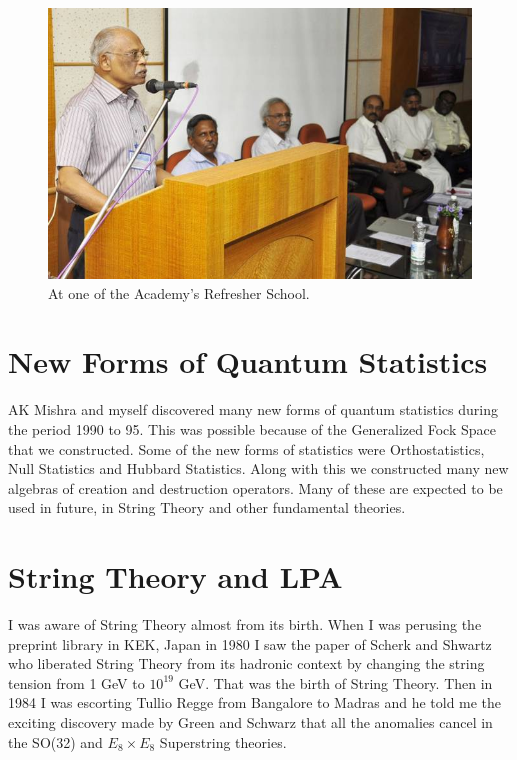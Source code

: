 \begin{figure}[h]
\centering
\includegraphics[width=\textwidth]{images/Rajaji-outreach-1.jpg}
\caption{At one of the Academy's Refresher School.}
\end{figure}
     
\section*{New Forms of Quantum Statistics}

AK Mishra and myself discovered many new forms of quantum statistics during
the period 1990 to 95. This was possible because of the Generalized Fock Space
that we constructed. Some of the new forms of statistics were Orthostatistics, 
Null Statistics and Hubbard Statistics. Along with this we constructed many
new algebras of creation and destruction operators. Many of these are expected
to be used in future, in String Theory and other fundamental theories.
\newpage

\section*{String Theory and LPA}

I was aware of String Theory almost from its birth. When I was perusing 
the preprint library in KEK, Japan in 1980 I saw the paper of Scherk and 
Shwartz who liberated String Theory from its hadronic context by 
changing the string tension from 1 GeV to $10^{19}$ GeV. That was the birth 
of String Theory. Then in 1984 I was escorting Tullio Regge from 
Bangalore to Madras and he told me the exciting discovery made by Green 
and Schwarz that all the anomalies cancel in the SO(32) and $E_8 \times E_8$ 
Superstring theories.

